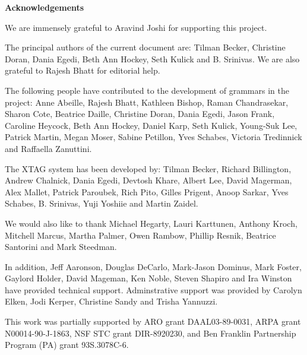 \pagestyle{plain}
\null\vfil
\begin{center}
{\bf Acknowledgements}
\end{center}
\setcounter{page}{0}

We are immensely grateful to Aravind Joshi for supporting this
project. 

The principal authors of the current document are: Tilman Becker,
Christine Doran, Dania Egedi, Beth Ann Hockey, Seth Kulick and B.
Srinivas. We are also grateful to Rajesh Bhatt for editorial help.

The following people have contributed to the development of grammars
in the project: Anne Abeille, Rajesh Bhatt, Kathleen Bishop, Raman
Chandrasekar, Sharon Cote, Beatrice Daille, Christine Doran, Dania
Egedi, Jason Frank, Caroline Heycock, Beth Ann Hockey, Daniel Karp,
Seth Kulick, Young-Suk Lee, Patrick Martin, Megan Moser, Sabine
Petillon, Yves Schabes, Victoria Tredinnick and Raffaella Zanuttini.

The XTAG system has been developed by: Tilman Becker, Richard
Billington, Andrew Chalnick, Dania Egedi, Devtosh Khare, Albert Lee,
David Magerman, Alex Mallet, Patrick Paroubek, Rich Pito, Gilles
Prigent, Anoop Sarkar, Yves Schabes, B. Srinivas, Yuji Yoshiie and
Martin Zaidel. 

We would also like to thank Michael Hegarty, Lauri Karttunen, Anthony
Kroch, Mitchell Marcus, Martha Palmer, Owen Rambow, Phillip Resnik,
Beatrice Santorini and Mark Steedman.

In addition, Jeff Aaronson, Douglas DeCarlo, Mark-Jason Dominus, Mark
Foster, Gaylord Holder, David Mageman, Ken Noble, Steven Shapiro and
Ira Winston have provided technical support.  Adminstrative support
was provided by Carolyn Elken, Jodi Kerper, Christine Sandy and Trisha
Yannuzzi.

This work was partially supported by ARO grant DAAL03-89-0031, ARPA
grant N00014-90-J-1863, NSF STC grant DIR-8920230, and Ben Franklin
Partnership Program (PA) grant 93S.3078C-6. 

\newpage

